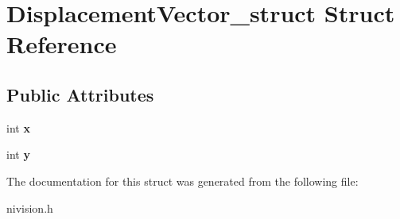 \hypertarget{structDisplacementVector__struct}{
\section{DisplacementVector\_\-struct Struct Reference}
\label{structDisplacementVector__struct}
}
\subsection*{Public Attributes}
\begin{DoxyCompactItemize}
\item 
\hypertarget{structDisplacementVector__struct_a15710665740a82e6f2dbda9bfa881649}{
int {\bfseries x}}
\label{structDisplacementVector__struct_a15710665740a82e6f2dbda9bfa881649}

\item 
\hypertarget{structDisplacementVector__struct_a4af1569e034c64fd03a6e578e39dd958}{
int {\bfseries y}}
\label{structDisplacementVector__struct_a4af1569e034c64fd03a6e578e39dd958}

\end{DoxyCompactItemize}


The documentation for this struct was generated from the following file:\begin{DoxyCompactItemize}
\item 
nivision.h\end{DoxyCompactItemize}
